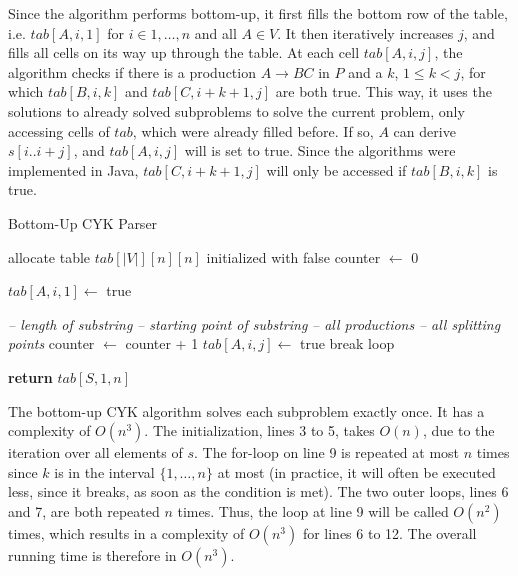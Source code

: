 Since the algorithm performs bottom-up, it first fills the bottom row of the table, i.e. $tab[A,i,1]$ for $i\in{1,\dots,n}$ and all $A\in V$.
It then iteratively increases $j$, and fills all cells on its way up through the table.
At each cell $tab[A,i,j]$, the algorithm checks if there is a production $A\rightarrow BC$ in $P$ and a $k$, $1 \leq k < j$, for which $tab[B,i,k]$ and $tab[C,i+k+1, j]$ are both true.
This way, it uses the solutions to already solved subproblems to solve the current problem, only accessing cells of $tab$, which were already filled before.
If so, $A$ can derive $s[i..i+j]$, and $tab[A,i,j]$ will is set to true.
Since the algorithms were implemented in Java, $tab[C,i+k+1, j]$ will only be accessed if $tab[B,i,k]$ is true.


\begin{algorithm}[H]
    \caption{Bottom-Up CYK Parser}
    \label{alg:bu}
    \begin{algorithmic}[1]
        \State allocate table $tab[|V|][n][n]$ initialized with false
        \State counter $\leftarrow$ 0
    
                \State $tab[A,i,1] \leftarrow$ true
            \EndFor
        \EndFor

         \hspace*{2.75cm}\textit{-- length of substring}
             \hspace*{1cm}\textit{-- starting point of substring}
                 \hspace*{1cm}\textit{-- all productions}
                     \hspace*{0.5cm}\textit{-- all splitting points}
                        \State counter $\leftarrow$ counter + 1
                            \State $tab[A,i,j]\leftarrow$ true
                            \State break loop
                        \EndIf
                    \EndFor
                \EndFor
            \EndFor
        \EndFor

        \State \textbf{return} $tab[S,1,n]$
        \EndFunction
    \end{algorithmic}
\end{algorithm}

The bottom-up CYK algorithm solves each subproblem exactly once.
It has a complexity of $O(n^3)$.
The initialization, lines 3 to 5, takes $O(n)$, due to the iteration over all elements of $s$.
The for-loop on line 9 is repeated at most $n$ times since $k$ is in the interval $\{1,\dots,n\}$ at most (in practice, it will often be executed less, since it breaks, as soon as the condition is met).
The two outer loops, lines 6 and 7, are both repeated $n$ times.
Thus, the loop at line 9 will be called $O(n^2)$ times, which results in a complexity of $O(n^3)$ for lines 6 to 12.
The overall running time is therefore in $O(n^3)$.

